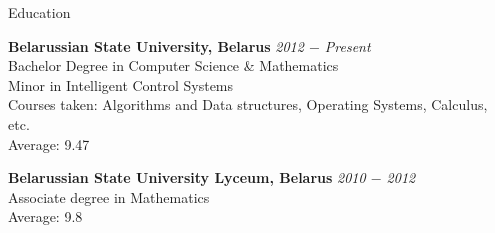 \documentclass{resume} %
\begin{document}

\begin{rSection}{Education}

{\bf Belarussian State University, Belarus} \hfill {\em 2012 $-$ Present} \\ 
Bachelor Degree in Computer Science \& Mathematics \\
Minor in Intelligent Control Systems \smallskip \\
Courses taken: Algorithms and Data structures, Operating Systems, Calculus, etc. \smallskip \\
Average: 9.47

{\bf Belarussian State University Lyceum, Belarus} \hfill {\em 2010 $-$ 2012} \\ 
Associate degree in Mathematics \\
Average: 9.8

\end{rSection}

\end{document}
